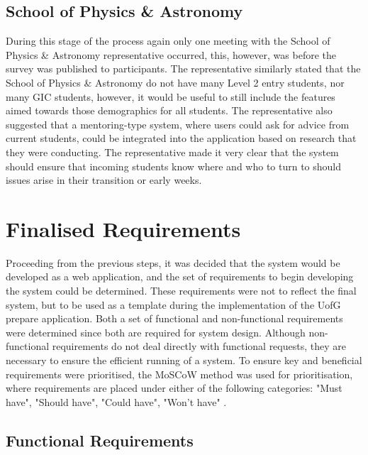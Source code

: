 \documentclass{l4proj}
\begin{document}
\subsection{School of Physics \& Astronomy}
During this stage of the process again only one meeting with the School of Physics \& Astronomy representative occurred, this, however, was before the survey was published to participants. The representative similarly stated that the School of Physics \& Astronomy do not have many Level 2 entry students,  nor many GIC students,  however,  it would be useful to still include the features aimed towards those demographics for all students. The representative also suggested that a mentoring-type system,  where users could ask for advice from current students,  could be integrated into the application based on research that they were conducting. The representative made it very clear that the system should ensure that incoming students know where and who to turn to should issues arise in their transition or early weeks.

\section{Finalised Requirements} \label{requirements}
Proceeding from the previous steps,  it was decided that the system would be developed as a web application,  and the set of requirements to begin developing the system could be determined. These requirements were not to reflect the final system,  but to be used as a template during the implementation of the UofG prepare application. Both a set of functional and non-functional requirements were determined since both are required for system design. Although non-functional requirements do not deal directly with functional requests,  they are necessary to ensure the efficient running of a system. To ensure key and beneficial requirements were prioritised,  the MoSCoW method was used for prioritisation,  where requirements are placed under either of the following categories: "Must have",  "Should have",  "Could have",  "Won't have" \citep{Monday.com_2024}.

\subsection{Functional Requirements}
\end{document}
